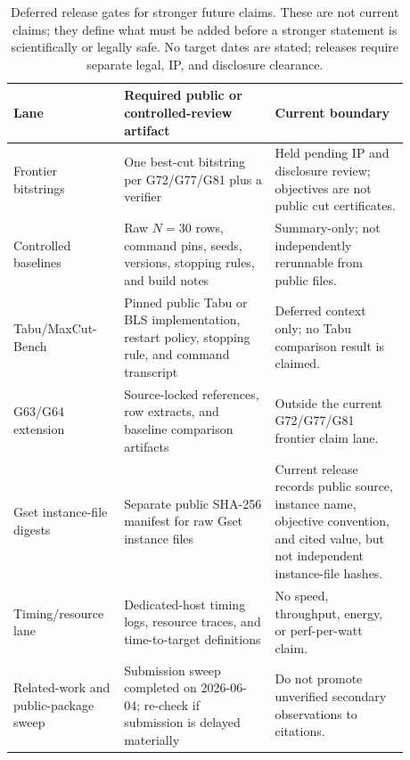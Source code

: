 \documentclass[11pt]{article}
\begin{document}
\begin{table}[tbp]
\centering
\caption{Deferred release gates for stronger future claims. These are not current claims; they define what must be added before a stronger statement is scientifically or legally safe. No target dates are stated; releases require separate legal, IP, and disclosure clearance.}
\label{tab:deferredgates}
\footnotesize
\begin{tabular}{@{}L{0.22\linewidth}L{0.35\linewidth}L{0.31\linewidth}@{}}
\toprule
Lane & Required public or controlled-review artifact & Current boundary \\
\midrule
Frontier bitstrings & One best-cut bitstring per G72/G77/G81 plus a verifier & Held pending IP and disclosure review; objectives are not public cut certificates. \\
Controlled baselines & Raw $N=30$ rows, command pins, seeds, versions, stopping rules, and build notes & Summary-only; not independently rerunnable from public files. \\
Tabu/MaxCut-Bench & Pinned public Tabu or BLS implementation, restart policy, stopping rule, and command transcript & Deferred context only; no Tabu comparison result is claimed. \\
G63/G64 extension & Source-locked references, row extracts, and baseline comparison artifacts & Outside the current G72/G77/G81 frontier claim lane. \\
Gset instance-file digests & Separate public SHA-256 manifest for raw Gset instance files & Current release records public source, instance name, objective convention, and cited value, but not independent instance-file hashes. \\
Timing/resource lane & Dedicated-host timing logs, resource traces, and time-to-target definitions & No speed, throughput, energy, or perf-per-watt claim. \\
Related-work and public-package sweep & Submission sweep completed on 2026-06-04; re-check if submission is delayed materially & Do not promote unverified secondary observations to citations. \\
\bottomrule
\end{tabular}
\end{table}
\end{document}
